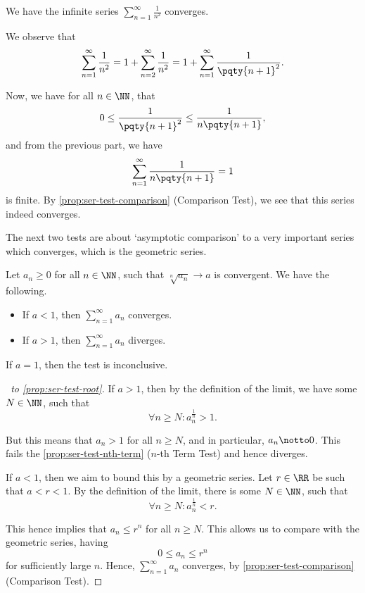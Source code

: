 \begin{example}
    \label{ex:ser-test-comparison}%
    We have the infinite series \(\sum_{n = 1}^{\infty} \frac{1}{n^2}\) converges.

    We observe that
    \[
        \sum_{n = 1}^{\infty} \frac{1}{n^2} = 1 + \sum_{n = 2}^{\infty} \frac{1}{n^2} = 1 + \sum_{n = 1}^{\infty} \frac{1}{\pqty{n + 1}^2}.
    \]

    Now, we have for all \(n \in \NN\), that
    \[
        0 \leq \frac{1}{\pqty{n + 1}^2} \leq \frac{1}{n \pqty{n + 1}},
    \]
    and from the previous part, we have
    \[
        \sum_{n = 1}^{\infty} \frac{1}{n\pqty{n + 1}} = 1
    \]
    is finite. By \autoref{prop:ser-test-comparison} (Comparison Test), we see that this series indeed converges.
\end{example}

The next two tests are about `asymptotic comparison' to a very important series which converges, which is the geometric series.

\begin{proposition}
    \label{prop:ser-test-root}%
    Let \(a_n \geq 0\) for all \(n \in \NN\), such that \(\sqrt[n]{a_n} \to a\) is convergent. We have the following.

    \begin{itemize}
        \item If \(a < 1\), then \(\sum_{n = 1}^{\infty} a_n\) converges.
        \item If \(a > 1\), then \(\sum_{n = 1}^{\infty} a_n\) diverges.
    \end{itemize}
\end{proposition}

\begin{remark}
    If \(a = 1\), then the test is inconclusive.
\end{remark}

\begin{proof}[\proofname\ to \autoref{prop:ser-test-root}]
    If \(a > 1\), then by the definition of the limit, we have some \(N \in \NN\), such that
    \[
        \forall n \geq N: a_n^{\frac{1}{n}} > 1.
    \]

    But this means that \(a_n > 1\) for all \(n \geq N\), and in particular, \(a_n \notto 0\). This fails the \autoref{prop:ser-test-nth-term} (\(n\)-th Term Test) and hence diverges.

    If \(a < 1\), then we aim to bound this by a geometric series. Let \(r \in \RR\) be such that \(a < r < 1\). By the definition of the limit, there is some \(N \in \NN\), such that
    \[
        \forall n \geq N: a_n^{\frac{1}{n}} < r.
    \]

    This hence implies that \(a_n \leq r^n\) for all \(n \geq N\). This allows us to compare with the geometric series, having
    \[
        0 \leq a_n \leq r^n
    \]
    for sufficiently large \(n\). Hence, \(\sum_{n = 1}^{\infty} a_n\) converges, by \autoref{prop:ser-test-comparison} (Comparison Test).
\end{proof}

